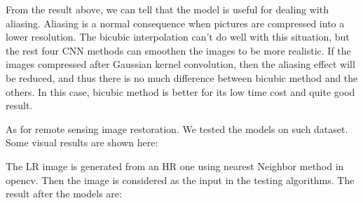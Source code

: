 \documentclass{article}
\begin{document}
  From the result above, we can tell that the model is useful for dealing with aliasing.
  Aliasing is a normal consequence when pictures are compressed into a lower resolution.
  The bicubic interpolation can't do well with this situation, 
  but the rest four CNN methods can smoothen the images to be more realistic.
  If the images compressed after Gaussian kernel convolution,
  then the aliasing effect will be reduced, and thus there is no much difference between bicubic method and the others.
  In this case, bicubic method is better for its low time cost and quite good result.
  
  As for remote sensing image restoration.
  We tested the models on such dataset. 
  Some visual results are shown here:

  The LR image is generated from an HR one using nearest Neighbor method in opencv.
  Then the image is considered as the input in the testing algorithms.
  The result after the models are:
\end{document}
